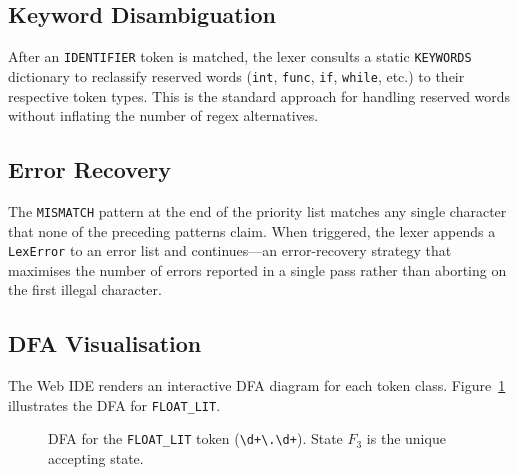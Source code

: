 \documentclass[conference]{IEEEtran}
\begin{document}
\subsection{Keyword Disambiguation}

After an \texttt{IDENTIFIER} token is matched, the lexer consults a
static \texttt{KEYWORDS} dictionary to reclassify reserved words
(\texttt{int}, \texttt{func}, \texttt{if}, \texttt{while}, etc.) to
their respective token types. This is the standard approach for
handling reserved words without inflating the number of regex
alternatives.

\subsection{Error Recovery}

The \texttt{MISMATCH} pattern at the end of the priority list matches
any single character that none of the preceding patterns claim. When
triggered, the lexer appends a \texttt{LexError} to an error list and
continues---an error-recovery strategy that maximises the number of
errors reported in a single pass rather than aborting on the first
illegal character.

\subsection{DFA Visualisation}

The Web IDE renders an interactive DFA diagram for each token class.
Figure~\ref{fig:dfa} illustrates the DFA for \texttt{FLOAT\_LIT}.

\begin{figure}[htbp]
\centering
{}
\caption{DFA for the \texttt{FLOAT\_LIT} token (\texttt{\textbackslash d+\textbackslash.\textbackslash d+}).
         State $F_3$ is the unique accepting state.}
\label{fig:dfa}
\end{figure}
\end{document}
